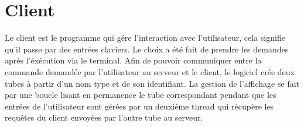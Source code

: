 \documentclass[12pt]{article}
\begin{document}
\section{Client}
    Le client est le programme qui gére l'interaction avec l'utilisateur, cela signifie qu'il passe par des entrées claviers.
    Le choix a été fait de prendre les demandes après l'éxécution via le terminal.
    Afin de pouvoir communiquer entre la commande demandée par l'utilisateur au serveur et le client, le logiciel crée deux tubes à partir d'un nom type et de son identifiant.
    La gestion de l'affichage se fait par une boucle lisant en permanence le tube correspondant pendant que les entrées de l'utilisateur sont gérées par un deuxiéme thread qui récupère les requêtes du client envoyées par l'autre tube au serveur.
\end{document}
